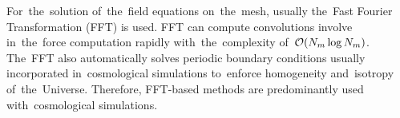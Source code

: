 % 
For~the~solution of~the~field equations on~the~mesh, usually the~Fast Fourier Transformation (FFT) is used. FFT can compute convolutions involve in~the~force computation rapidly with~the~complexity of~$\mathcal{O}(N_m\log N_m)$. The~FFT also automatically solves periodic boundary conditions usually incorporated in~cosmological simulations to~enforce homogeneity and~isotropy of~the~Universe. Therefore, FFT-based methods are predominantly used with~cosmological simulations.



